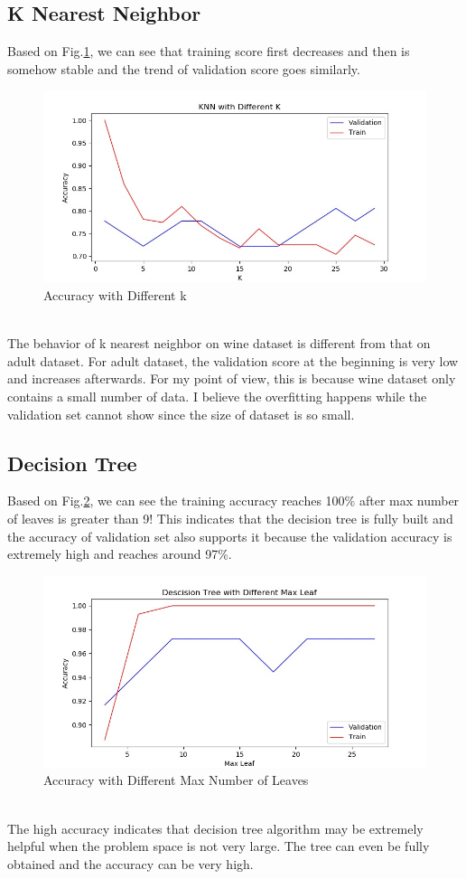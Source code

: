 \documentclass[11pt]{article}
\begin{document}
\subsection{K Nearest Neighbor}
Based on Fig.\ref{fig:wine_knn}, we can see that training score first decreases and then is somehow stable and the trend of validation score goes similarly. 
\begin{figure}[h!]
  \includegraphics[width=\linewidth]{./wine/knn_k.jpg}
  \caption{Accuracy with Different k}
  \label{fig:wine_knn}
\end{figure}\\
The behavior of k nearest neighbor on wine dataset is different from that on adult dataset. For adult dataset, the validation score at the beginning is very low and increases afterwards. For my point of view, this is because wine dataset only contains a small number of data. I believe the overfitting happens while the validation set cannot show since the size of dataset is so small.
\subsection{Decision Tree}
Based on Fig.\ref{fig:wine_dt}, we can see the training accuracy reaches 100\% after max number of leaves is greater than 9! This indicates that the decision tree is fully built and the accuracy of validation set also supports it because the validation accuracy is extremely high and reaches around 97\%.
\begin{figure}[h!]
  \includegraphics[width=\linewidth]{./wine/dt_maxleaf.jpg}
  \caption{Accuracy with Different Max Number of Leaves}
  \label{fig:wine_dt}
\end{figure}\\
The high accuracy indicates that decision tree algorithm may be extremely helpful when the problem space is not very large. The tree can even be fully obtained and the accuracy can be very high.
\end{document}
